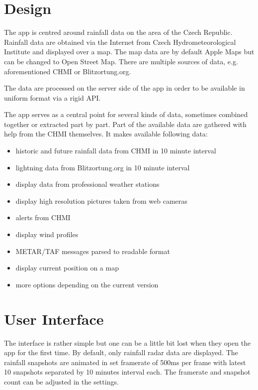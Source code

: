\documentclass[11pt,a4paper]{article}
\begin{document}
\section{Design}
The app is centred around rainfall data on the area of the Czech Republic. Rainfall data are obtained via the Internet from Czech Hydrometeorological Institute and displayed over a map. The map data are by default Apple Maps but can be changed to Open Street Map. There are multiple sources of data, e.g. aforementioned CHMI or Blitzortung.org.

The data are processed on the server side of the app in order to be available in uniform format via a rigid API.

The app serves as a central point for several kinds of data, sometimes combined together or extracted part by part. Part of the available data are gathered with help from the CHMI themselves. It makes available following data:
\begin{itemize}
    \item historic and future rainfall data from CHMI in 10 minute interval
    \item lightning data from Blitzortung.org in 10 minute interval
    \item display data from professional weather stations
    \item display high resolution pictures taken from web cameras
    \item alerts from CHMI
    \item display wind profiles
    \item METAR/TAF messages parsed to readable format
    \item display current position on a map
    \item more options depending on the current version
\end{itemize}

\section{User Interface}
The interface is rather simple but one can be a little bit lost when they open the app for the first time. By default, only rainfall radar data are displayed.
The rainfall snapshots are animated in set framerate of 500ms per frame with latest 10 snapshots separated by 10 minutes interval each. The framerate and snapshot count can be adjusted in the settings.
\end{document}
